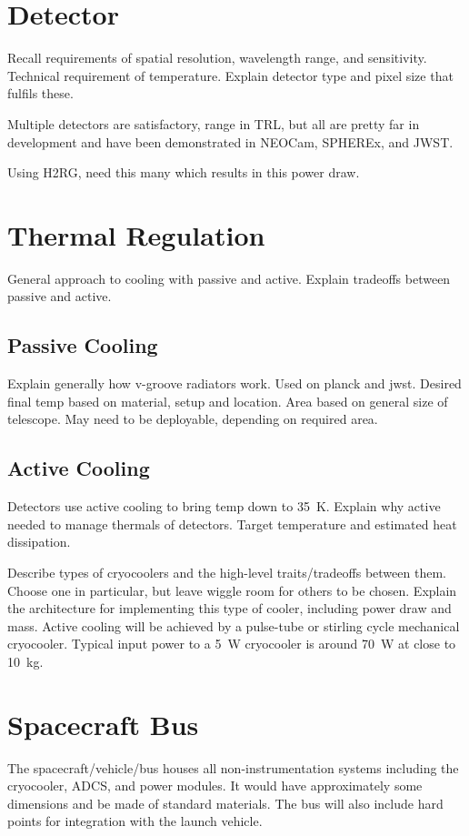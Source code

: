\documentclass{ws-jai}
\begin{document}
\section{Detector}
\label{S:detector}
Recall requirements of spatial resolution, wavelength range, and sensitivity. Technical requirement of temperature. Explain detector type and pixel size that fulfils these.

Multiple detectors are satisfactory, range in TRL, but all are pretty far in development and have been demonstrated in NEOCam, SPHEREx, and JWST\@.

Using H2RG, need this many which results in this power draw.

\section{Thermal Regulation}
\label{S:tempregulation}
General approach to cooling with passive and active. Explain tradeoffs between passive and active.

\subsection{Passive Cooling}
\label{sS:vgrooves}
Explain generally how v-groove radiators work.
Used on planck and jwst.
Desired final temp based on material, setup and location.
Area based on general size of telescope.
May need to be deployable, depending on required area.

\subsection{Active Cooling}
\label{sS:cryocooler}
Detectors use active cooling to bring temp down to \SI{35}{\kelvin}.
Explain why active needed to manage thermals of detectors.
Target temperature and estimated heat dissipation.

Describe types of cryocoolers and the high-level traits/tradeoffs between them. Choose one in particular, but leave wiggle room for others to be chosen.
Explain the architecture for implementing this type of cooler, including power draw and mass.
Active cooling will be achieved by a pulse-tube or stirling cycle mechanical cryocooler.
Typical input power to a \SI{5}{\watt} cryocooler is around \SI{70}{\watt} at close to \SI{10}{\kilo\gram}.

\section{Spacecraft Bus}
\label{S:bus}
The spacecraft/vehicle/bus houses all non-instrumentation systems including the cryocooler, ADCS, and power modules.
It would have approximately some dimensions and be made of standard materials.
The bus will also include hard points for integration with the launch vehicle.
\end{document}

